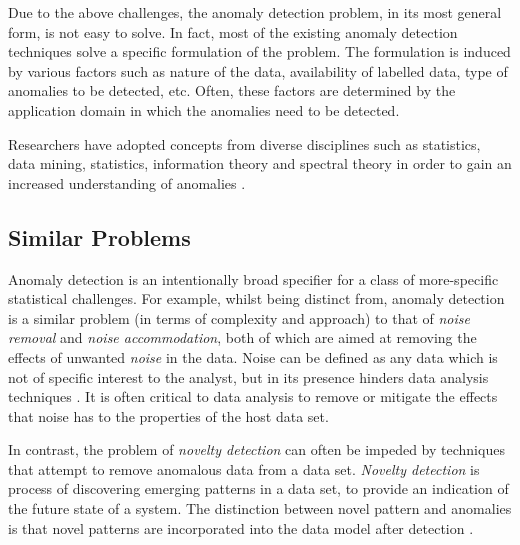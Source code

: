 Due to the above challenges, the anomaly detection problem, in its most general
form, is not easy to solve. In fact, most of the existing anomaly detection
techniques solve a specific formulation of the problem. The formulation is
induced by various factors such as nature of the data, availability of labelled
data, type of anomalies to be detected, etc. Often, these factors are determined
by the application domain in which the anomalies need to be detected.

Researchers have adopted concepts from diverse disciplines such as statistics,
data mining, statistics, information theory and spectral theory in order to gain
an increased understanding of anomalies \cite{Chandola:2007}.

\subsection{Similar Problems}
\label{anomalyDetection:similarProblems}
Anomaly detection is an intentionally broad specifier for a class of
more-specific statistical challenges. For example, whilst being distinct from,
anomaly detection is a similar problem (in terms of complexity and approach) to
that of \emph{noise removal} and \emph{noise accommodation}, both of which are
aimed at removing the effects of unwanted \emph{noise} in the data. Noise can be
defined as any data which is not of specific interest to the analyst, but in its
presence hinders data analysis techniques \cite{Chandola:2007}. It is often
critical to data analysis to remove or mitigate the effects that noise has to
the properties of the host data set.

In contrast, the problem of \emph{novelty detection} can often be impeded by
techniques that attempt to remove anomalous data from a data set. \emph{Novelty
detection} is process of discovering emerging patterns in a data set, to provide
an indication of the future state of a system. The distinction between novel
pattern and anomalies is that novel patterns are incorporated into the data
model after detection \cite{Chandola:2007}.

